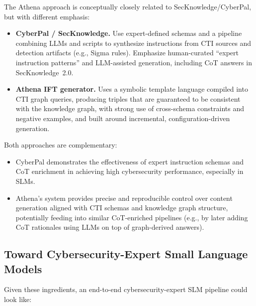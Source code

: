 \documentclass[10pt]{article}
\begin{document}
The Athena approach is conceptually closely related to SecKnowledge/CyberPal, but with different emphasis:

\begin{itemize}[leftmargin=*]
  \item \textbf{CyberPal / SecKnowledge.} Use expert-defined schemas and a pipeline combining LLMs and scripts to synthesize instructions from CTI sources and detection artifacts (e.g., Sigma rules). Emphasize human-curated ``expert instruction patterns'' and LLM-assisted generation, including CoT answers in SecKnowledge~2.0.\cite{levi2024cyberpal,levi2025toward}
  \item \textbf{Athena IFT generator.} Uses a symbolic template language compiled into CTI graph queries, producing triples that are guaranteed to be consistent with the knowledge graph, with strong use of cross-schema constraints and negative examples, and built around incremental, configuration-driven generation.\cite{cardei2025ift}
\end{itemize}

Both approaches are complementary:

\begin{itemize}[leftmargin=*]
  \item CyberPal demonstrates the effectiveness of expert instruction schemas and CoT enrichment in achieving high cybersecurity performance, especially in SLMs.
  \item Athena’s system provides precise and reproducible control over content generation aligned with CTI schemas and knowledge graph structure, potentially feeding into similar CoT-enriched pipelines (e.g., by later adding CoT rationales using LLMs on top of graph-derived answers).
\end{itemize}

\subsection{Toward Cybersecurity-Expert Small Language Models}

Given these ingredients, an end-to-end cybersecurity-expert SLM pipeline could look like:
\end{document}
